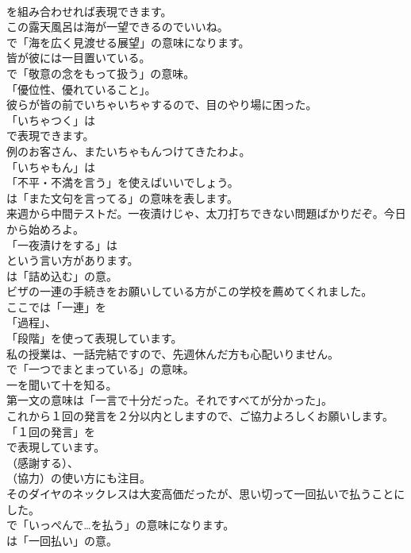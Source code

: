 \documentclass[8pt]{extreport}
\begin{document}
\begin{CJK}{UTF8}{min}
\\	を組み合わせれば表現できます。	
\\	この露天風呂は海が一望できるのでいいね。 
\\	で「海を広く見渡せる展望」の意味になります。	
\\	皆が彼には一目置いている。 
\\	で「敬意の念をもって扱う」の意味。
\\	「優位性、優れていること」。	
\\	彼らが皆の前でいちゃいちゃするので、目のやり場に困った。 
\\	「いちゃつく」は 
\\	で表現できます。	
\\	例のお客さん、またいちゃもんつけてきたわよ。 
\\	「いちゃもん」は
\\	「不平・不満を言う」を使えばいいでしょう。
\\	は「また文句を言ってる」の意味を表します。	
\\	来週から中間テストだ。一夜漬けじゃ、太刀打ちできない問題ばかりだぞ。今日から始めろよ。 
\\	「一夜漬けをする」は
\\	という言い方があります。
\\	は「詰め込む」の意。	
\\	ビザの一連の手続きをお願いしている方がこの学校を薦めてくれました。 
\\	ここでは「一連」を
\\	「過程」、
\\	「段階」を使って表現しています。	
\\	私の授業は、一話完結ですので、先週休んだ方も心配いりません。 
\\	で「一つでまとまっている」の意味。	
\\	一を聞いて十を知る。 
\\	第一文の意味は「一言で十分だった。それですべてが分かった」。	
\\	これから１回の発言を２分以内としますので、ご協力よろしくお願いします。 
\\	「１回の発言」を 
\\	で表現しています。
\\	（感謝する）、
\\	（協力）の使い方にも注目。	
\\	そのダイヤのネックレスは大変高価だったが、思い切って一回払いで払うことにした。 
\\	で「いっぺんで…を払う」の意味になります。
\\	は「一回払い」の意。	

\end{CJK}
\end{document}

